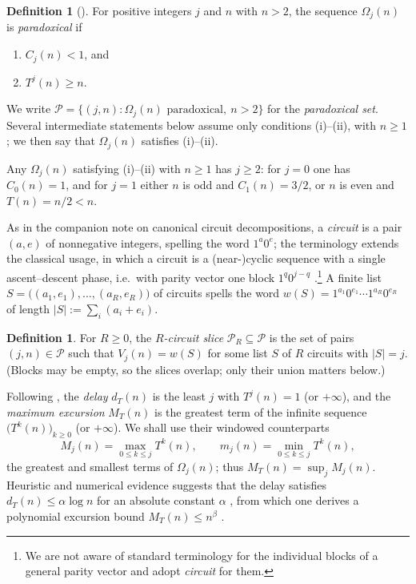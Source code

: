 \documentclass[11pt]{amsart}
\theoremstyle{plain}
\theoremstyle{definition}
\newtheorem{definition}[theorem]{Definition}
\theoremstyle{remark}
\newcommand{\Par}{\mathcal{P}}        %
\newcommand{\ParR}[1]{\Par_{#1}}      %
\begin{document}
\begin{definition}[{\cite[Def.~1.1]{Roz25}}]\label{def:paradoxical}
For positive integers $j$ and $n$ with $n>2$, the sequence $\Omega_j(n)$ is
\emph{paradoxical} if
\begin{enumerate}
\item[(i)] $C_j(n)<1$, and
\item[(ii)] $T^j(n)\ge n$.
\end{enumerate}
We write $\Par=\{(j,n):\Omega_j(n)\text{ paradoxical},\ n>2\}$ for the
\emph{paradoxical set}.  Several intermediate statements below assume only
conditions (i)--(ii), with $n\ge 1$; we then say that $\Omega_j(n)$
satisfies (i)--(ii).
\end{definition}

Any $\Omega_j(n)$ satisfying (i)--(ii) with $n\ge1$ has $j\ge 2$: for $j=0$
one has $C_0(n)=1$, and for $j=1$ either $n$ is odd and $C_1(n)=3/2$, or $n$
is even and $T(n)=n/2<n$.

As in the companion note on canonical circuit decompositions, a
\emph{circuit} is a pair $(a,e)$ of nonnegative integers, spelling the word
$1^{a}0^{e}$; the terminology extends the classical usage, in which a
circuit is a (near-)cyclic sequence with a single ascent--descent phase,
i.e.\ with parity vector one block $1^{q}0^{j-q}$
\cite[App.~A]{Roz25}.\footnote{We are not aware of standard terminology for
the individual blocks of a general parity vector and adopt \emph{circuit}
for them.}  A finite list $S=\bigl((a_1,e_1),\dots,(a_R,e_R)\bigr)$ of
circuits spells the word
$w(S)=1^{a_1}0^{e_1}\cdots 1^{a_R}0^{e_R}$ of length
$|S|:=\sum_{i}(a_i+e_i)$.

\begin{definition}\label{def:slice}
For $R\ge 0$, the \emph{$R$-circuit slice} $\ParR{R}\subseteq\Par$ is the
set of pairs $(j,n)\in\Par$ such that $V_j(n)=w(S)$ for some list $S$ of $R$
circuits with $|S|=j$.  (Blocks may be empty, so the slices overlap; only
their union matters below.)
\end{definition}

Following \cite[Def.~5.2]{Roz25}, the \emph{delay} $d_T(n)$ is the least $j$
with $T^j(n)=1$ (or $+\infty$), and the \emph{maximum excursion} $M_T(n)$ is
the greatest term of the infinite sequence $\bigl(T^k(n)\bigr)_{k\ge 0}$ (or
$+\infty$).  We shall use their windowed counterparts
\[
M_j(n)=\max_{0\le k\le j}T^k(n),
\qquad
m_j(n)=\min_{0\le k\le j}T^k(n),
\]
the greatest and smallest terms of $\Omega_j(n)$; thus
$M_T(n)=\sup_j M_j(n)$.  Heuristic and numerical evidence suggests that the
delay satisfies $d_T(n)\le\alpha\log n$ for an absolute constant $\alpha$
\cite[Conj.~6.2]{Roz25}, from which one derives a polynomial excursion bound
$M_T(n)\le n^{\beta}$ \cite[eq.~(16)]{Roz25}.
\end{document}

